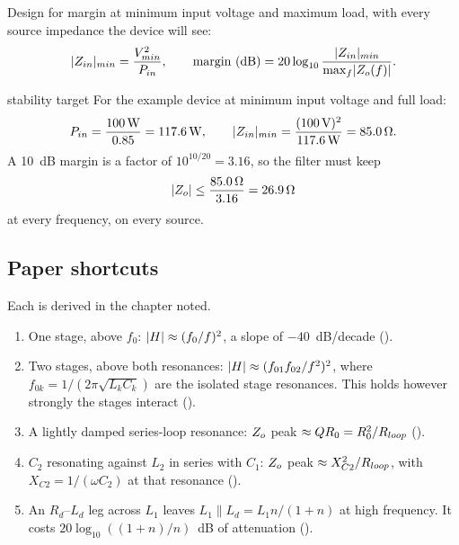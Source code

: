 Design for margin at minimum input voltage and maximum load, with every source
impedance the device will see:
\begin{equation}\label{eq:middlebrook}
	\lvert Z_{in}\rvert_{min} = \frac{V_{min}^2}{P_{in}}, \qquad
	\text{margin (dB)} = 20\log_{10}\frac{\lvert Z_{in}\rvert_{min}}{\max_f \lvert Z_o(f)\rvert}.
\end{equation}

\begin{examplebox}[label=ex:zin]{stability target}
	For the example device at minimum input voltage and full load:
	\[
		P_{in} = \frac{\qty{100}{\watt}}{0.85} = \qty{117.6}{\watt}, \qquad
		\lvert Z_{in}\rvert_{min} = \frac{(\qty{100}{\volt})^2}{\qty{117.6}{\watt}} = \qty{85.0}{\ohm}.
	\]
	A 10~dB margin is a factor of $10^{10/20} = 3.16$, so the filter must keep
	\[
		\lvert Z_o\rvert \leq \frac{\qty{85.0}{\ohm}}{3.16} = \qty{26.9}{\ohm}
	\]
	at every frequency, on every source.
\end{examplebox}

\subsection{Paper shortcuts}

Each is derived in the chapter noted.

\begin{enumerate}
	\item One stage, above $f_0$: $\lvert H\rvert \approx (f_0/f)^2$, a slope of
	      $-40$~dB/decade ().
	\item Two stages, above both resonances: $\lvert H\rvert \approx (f_{01}f_{02}/f^2)^2$,
	      where $f_{0k} = 1/(2\pi\sqrt{L_kC_k})$ are the isolated stage resonances.
	      This holds however strongly the stages interact ().
	\item A lightly damped series-loop resonance: $Z_o$ peak $\approx QR_0 = R_0^2/R_{loop}$
	      ().
	\item $C_2$ resonating against $L_2$ in series with $C_1$: $Z_o$ peak
	      $\approx X_{C2}^2/R_{loop}$, with $X_{C2} = 1/(\omega C_2)$ at that
	      resonance ().
	\item An $R_d$--$L_d$ leg across $L_1$ leaves $L_1 \parallel L_d = L_1 n/(1+n)$
	      at high frequency. It costs $20\log_{10}((1+n)/n)$~dB of attenuation
	      ().
\end{enumerate}
